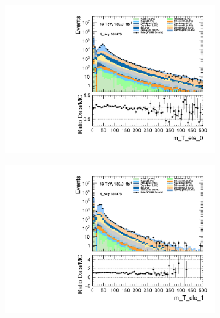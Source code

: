 \begin{figure}
    \centering
    \begin{subfigure}{.49\textwidth}
        \includegraphics[width=\textwidth]{Figures/MC_Data_comp/m_T_ele_0.pdf}
        \caption{}
        \label{fig:et}
    \end{subfigure}
    \hfill
    \begin{subfigure}{.49\textwidth}
        \includegraphics[width=\textwidth]{Figures/MC_Data_comp/m_T_ele_1.pdf}
        \caption{ }
        \label{fig:flcp}
    \end{subfigure}
    \hfill 
    \begin{subfigure}{.49\textwidth}

\end{subfigure}
\end{figure}
